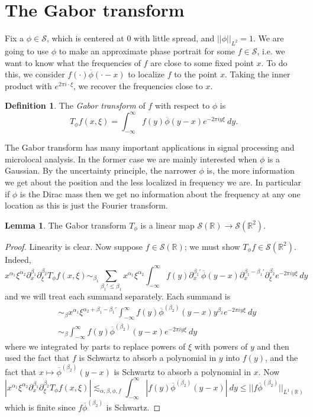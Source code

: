 \documentclass[12pt]{report}
\newcommand{\RR}{\mathbb{R}}
\newcommand{\Sch}{\mathcal{S}}
\newcommand{\dfn}[1]{\emph{#1}\index{#1}}
\theoremstyle{definition}
\newtheorem{lemma}[theorem]{Lemma}
\newtheorem{definition}[theorem]{Definition}
\begin{document}
\section{The Gabor transform}
Fix a $\phi \in \Sch$, which is centered at $0$ with little spread, and $||\phi||_{L^2} = 1$.
We are going to use $\phi$ to make an approximate phase portrait for some $f \in \Sch$, i.e. we want to know what the frequencies of $f$ are close to some fixed point $x$.
To do this, we consider $f(\cdot)\overline \phi(\cdot - x)$ to localize $f$ to the point $x$. Taking the inner product with $e^{2\pi i\cdot\xi}$, we recover the frequencies close to $x$.
\begin{definition}
The \dfn{Gabor transform} of $f$ with respect to $\phi$ is
$$T_\phi f(x, \xi) = \int_{-\infty}^\infty f(y) \overline \phi(y - x)e^{-2\pi iy\xi}~dy.$$
\end{definition}
The Gabor transform has many important applications in signal processing and microlocal analysis. In the former case we are mainly interested when $\phi$ is a Gaussian.
By the uncertainty principle, the narrower $\phi$ is, the more information we get about the position and the less localized in frequency we are.
In particular if $\phi$ is the Dirac mass then we get no information about the frequency at any one location as this is just the Fourier transform.
\begin{lemma}
The Gabor transform $T_\phi$ is a linear map $\Sch(\RR) \to \Sch(\RR^2)$.
\end{lemma}
\begin{proof}
Linearity is clear. Now suppose $f \in \Sch(\RR)$; we must show $T_\phi f \in \Sch(\RR^2)$. Indeed,
$$x^{\alpha_1} \xi^{\alpha_2} \partial_x^{\beta_1} \partial_\xi^{\beta_2} T_\phi f(x, \xi)
\sim_{\beta_1} \sum_{\beta_1' \leq \beta_1} x^{\alpha_1} \xi^{\alpha_2} \int_{-\infty}^\infty f(y) \partial_x^{\beta_1'}
\overline \phi(y - x) \partial_x^{\beta_1-\beta_1'} \partial_\xi^{\beta_2} e^{-2\pi iy\xi} ~dy$$
and we will treat each summand separately. Each summand is
\begin{align*}
&\sim_\beta x^{\alpha_1} \xi^{\alpha_2 + \beta_1 - \beta_1'} \int_{-\infty}^\infty f(y)\overline \phi^{(\beta_2)}(y - x) y^{\beta_2} e^{-2\pi iy\xi} ~dy\\
&\sim_\beta \int_{-\infty}^\infty f(y) \overline \phi^{(\beta_2)}(y-x) e^{-2\pi i y\xi} ~dy
\end{align*}
where we integrated by parts to replace powers of $\xi$ with powers of $y$ and then used the fact that $f$ is Schwartz to absorb a polynomial in $y$ into $f(y)$, and the fact that $x \mapsto \overline \phi^{(\beta_2)}(y-x)$ is Schwartz to absorb a polynomial in $x$.
Now
$$|x^{\alpha_1} \xi^{\alpha_2} \partial_x^{\beta_1} \partial_\xi^{\beta_2} T_\phi f(x, \xi)| \lesssim_{\alpha,\beta,\phi,f} \int_{-\infty}^\infty |f(y)\overline \phi^{(\beta_2)}(y-x)| ~dy \leq ||f\overline \phi^{(\beta_2)}||_{L^1(\RR)}$$
which is finite since $f\overline \phi^{(\beta_2)}$ is Schwartz.
\end{proof}
\end{document}
